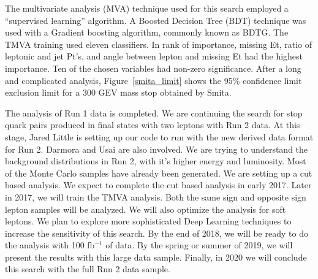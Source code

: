 The multivariate analysis (MVA) technique used for this search employed a ``supervised learning'' algorithm. A Boosted Decision Tree (BDT) technique was used with a Gradient boosting algorithm, commonly known as BDTG. The TMVA training used eleven classifiers. In rank of importance, missing Et, ratio of leptonic and jet Pt's, and angle between lepton and missing Et had the highest importance. Ten of the chosen variables had non-zero significance. After a long and complicated analysis, 
Figure~\ref{smita_limit} shows the 95\% confidence limit exclusion limit for a 300 GEV mass stop obtained by Smita.



The analysis of Run 1 data is completed. We are continuing the search for stop quark pairs produced in final states with two leptons with Run 2 data. At this stage, Jared Little is setting up our code to run with the new derived data format for Run 2. Darmora and Usai are also involved. We are trying to understand the background distributions in Run 2, with it's higher energy and luminosity. Most of the Monte Carlo samples have already been generated. We are setting up a cut based analysis. We expect to complete the cut based analysis in early 2017. Later in 2017, we will train the TMVA analysis. Both the same sign and opposite sign lepton samples will be analyzed. We will also optimize the analysis for soft leptons. We plan to explore more sophisticated Deep Learning techniques to increase the sensitivity of this search. By the end of 2018, we will be ready to do the analysis with 100 fb$^{-1}$ of data. By the spring or summer of 2019, we will present the results with this large data sample. Finally, in 2020 we will conclude this search with the full Run 2 data sample.
